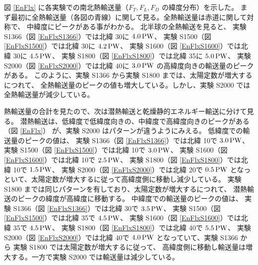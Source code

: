 \documentclass[body]{subfiles}
\begin{document}
図 \ref{EnFlx} に各実験での南北熱輸送量（\(F_T, F_L, F_D\) の緯度分布）を示した。
まず最初に全熱輸送量（各図の青線）に関して見る。全熱輸送量は赤道に関して対称で、
中緯度にピークがある事がわかる。
北半球の全熱輸送を見ると、
実験 S1366（図 \ref{EnFlxS1366}）では北緯 30\textdegree に \(4.0\hmu{PW}\)、
実験 S1500（図 \ref{EnFlxS1500}）では北緯 30\textdegree に \(4.2\hmu{PW}\)、
実験 S1600（図 \ref{EnFlxS1600}）では北緯 30\textdegree に \(4.5\hmu{PW}\)、
実験 S1800（図 \ref{EnFlxS1800}）では北緯 35\textdegree に \(5.0\hmu{PW}\)、
実験 S2000（図 \ref{EnFlxS2000}）では北緯 40\textdegree に \(3.0\hmu{PW}\)
の高緯度向きの輸送量のピークがある。
このように、実験 S1366 から実験 S1800 までは、太陽定数が増大するにつれて、
全熱輸送量のピークの値も増大している。しかし、実験 S2000 では全熱輸送量が減少している。

熱輸送量の合計を見たので、次は潜熱輸送と乾燥静的エネルギー輸送に分けて見る。
潜熱輸送は、低緯度で低緯度向きの、中緯度で高緯度向きのピークがある（図 \ref{EnFlx}）
が、実験 S2000 はパターンが違うようにみえる。
低緯度での輸送量のピークの値は、
実験 S1366（図 \ref{EnFlxS1366}）では北緯 10\textdegree で \(3.0\hmu{PW}\)、
実験 S1500（図 \ref{EnFlxS1500}）では北緯 10\textdegree で \(3.0\hmu{PW}\)、
実験 S1600（図 \ref{EnFlxS1600}）では北緯 10\textdegree で \(2.5\hmu{PW}\)、
実験 S1800（図 \ref{EnFlxS1800}）では北緯 10\textdegree で \(1.5\hmu{PW}\)、
実験 S2000（図 \ref{EnFlxS2000}）では北緯 20\textdegree で \(0.5\hmu{PW}\)
となっといて、太陽定数が増大するに従って高緯度側に移動し減少している。
実験 S1800 までは同じパターンを有しており、太陽定数が増大するにつれて、
潜熱輸送のピークの緯度が高緯度に移動する。
中緯度での輸送量のピークの値は、
実験 S1366（図 \ref{EnFlxS1366}）では北緯 30\textdegree で \(3.5\hmu{PW}\)、
実験 S1500（図 \ref{EnFlxS1500}）では北緯 35\textdegree で \(4.5\hmu{PW}\)、
実験 S1600（図 \ref{EnFlxS1600}）では北緯 35\textdegree で \(4.5\hmu{PW}\)、
実験 S1800（図 \ref{EnFlxS1800}）では北緯 40\textdegree で \(5.5\hmu{PW}\)、
実験 S2000（図 \ref{EnFlxS2000}）では北緯 40\textdegree で \(4.0\hmu{PW}\)
となっていて、実験 S1366 から 実験 S1800 では太陽定数が増大するに従って、
高緯度側に移動し輸送量は増大する。一方で実験 S2000 では輸送量は減少している。
\end{document}
